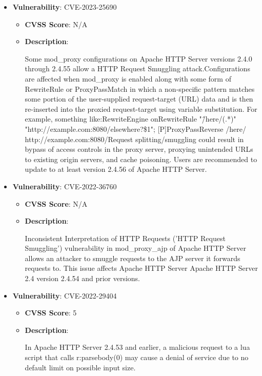 \documentclass{article}
\begin{document}
\begin{itemize}
        \item \textbf{Vulnerability}: CVE-2023-25690
        \begin{itemize}
            \item \textbf{CVSS Score}:  N/A 
            \item \textbf{Description}:
            \parbox[t]{0.9\linewidth}{
                \ttfamily Some mod\_proxy configurations on Apache HTTP Server versions 2.4.0 through 2.4.55 allow a HTTP Request Smuggling attack.Configurations are affected when mod\_proxy is enabled along with some form of RewriteRule or ProxyPassMatch in which a non-specific pattern matches some portion of the user-supplied request-target (URL) data and is then re-inserted into the proxied request-target using variable substitution. For example, something like:RewriteEngine onRewriteRule "\^/here/(.*)" "http://example.com:8080/elsewhere?\$1"; [P]ProxyPassReverse /here/ http://example.com:8080/Request splitting/smuggling could result in bypass of access controls in the proxy server, proxying unintended URLs to existing origin servers, and cache poisoning. Users are recommended to update to at least version 2.4.56 of Apache HTTP Server.
            }
        \end{itemize}
    
        \item \textbf{Vulnerability}: CVE-2022-36760
        \begin{itemize}
            \item \textbf{CVSS Score}:  N/A 
            \item \textbf{Description}:
            \parbox[t]{0.9\linewidth}{
                \ttfamily Inconsistent Interpretation of HTTP Requests ('HTTP Request Smuggling') vulnerability in mod\_proxy\_ajp of Apache HTTP Server allows an attacker to smuggle requests to the AJP server it forwards requests to.  This issue affects Apache HTTP Server Apache HTTP Server 2.4 version 2.4.54 and prior versions.
            }
        \end{itemize}
    
        \item \textbf{Vulnerability}: CVE-2022-29404
        \begin{itemize}
            \item \textbf{CVSS Score}:  5 
            \item \textbf{Description}:
            \parbox[t]{0.9\linewidth}{
                \ttfamily In Apache HTTP Server 2.4.53 and earlier, a malicious request to a lua script that calls r:parsebody(0) may cause a denial of service due to no default limit on possible input size.
            }
        \end{itemize}
    

\end{itemize}
\end{document}
